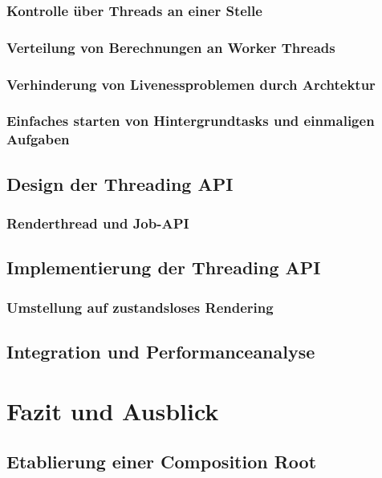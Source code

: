 \documentclass[12pt,a4paper,listof=totocnumbered,parskip=half]{scrreprt}
\begin{document}
\subsection{Kontrolle über Threads an einer Stelle}

\subsection{Verteilung von Berechnungen an Worker Threads}
\subsection{Verhinderung von Livenessproblemen durch Archtektur}
\subsection{Einfaches starten von Hintergrundtasks und einmaligen Aufgaben}

\section{Design der Threading API}

\subsection{Renderthread und Job-API}


\section{Implementierung der Threading API}


\subsection{Umstellung auf zustandsloses Rendering}

\section{Integration und Performanceanalyse}

\chapter{Fazit und Ausblick}
\section{Etablierung einer Composition Root}

\printnoidxglossaries

\printbibliography[title={Literaturverzeichnis},heading=bibintoc,notkeyword=online]

\printbibliography[title={Quellenverzeichnis},heading=bibintoc,keyword=online] 
\end{document}
